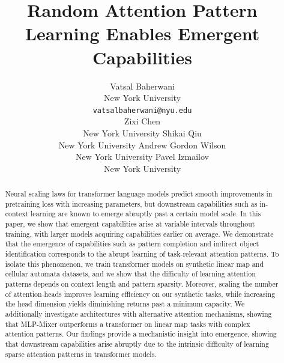 \documentclass{article}
\title{Random Attention Pattern Learning Enables Emergent Capabilities}
\author{%
  Vatsal Baherwani \\
  New York University \\
  \texttt{vatsalbaherwani@nyu.edu} \\
  \And
  Zixi Chen \\
  New York University
  \And
  Shikai Qiu \\
  New York University
  \AND
  Andrew Gordon Wilson \\
  New York University
  \And
  Pavel Izmailov \\
  New York University
}
\begin{document}
\maketitle

\begin{abstract}
Neural scaling laws for transformer language models predict smooth improvements in pretraining loss with increasing parameters, but downstream capabilities such as in-context learning are known to emerge abruptly past a certain model scale. In this paper, we show that emergent capabilities arise at variable intervals throughout training, with larger models acquiring capabilities earlier on average. We demonstrate that the emergence of capabilities such as pattern completion and indirect object identification corresponds to the abrupt learning of task-relevant attention patterns. To isolate this phenomenon, we train transformer models on synthetic linear map and cellular automata datasets, and we show that the difficulty of learning attention patterns depends on context length and pattern sparsity.  Moreover, scaling the number of attention heads improves learning efficiency on our synthetic tasks, while increasing the head dimension yields diminishing returns past a minimum capacity. We additionally investigate architectures with alternative attention mechanisms, showing that MLP-Mixer outperforms a transformer on linear map tasks with complex attention patterns. Our findings provide a mechanistic insight into emergence, showing that downstream capabilities arise abruptly due to the intrinsic difficulty of learning sparse attention patterns in transformer models.
\end{abstract}


\end{document}
